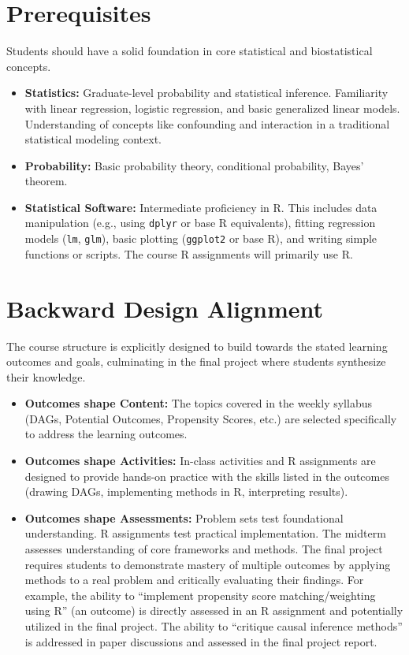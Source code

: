 \documentclass[10.5pt]{article}
\begin{document}
\section{Prerequisites}
Students should have a solid foundation in core statistical and biostatistical concepts.
\begin{itemize}
    \item \textbf{Statistics:} Graduate-level probability and statistical inference. Familiarity with linear regression, logistic regression, and basic generalized linear models. Understanding of concepts like confounding and interaction in a traditional statistical modeling context.
    \item \textbf{Probability:} Basic probability theory, conditional probability, Bayes' theorem.
    \item \textbf{Statistical Software:} Intermediate proficiency in R. This includes data manipulation (e.g., using \texttt{dplyr} or base R equivalents), fitting regression models (\texttt{lm}, \texttt{glm}), basic plotting (\texttt{ggplot2} or base R), and writing simple functions or scripts. The course R assignments will primarily use R.
\end{itemize}

\section{Backward Design Alignment}
The course structure is explicitly designed to build towards the stated learning outcomes and goals, culminating in the final project where students synthesize their knowledge.
\begin{itemize}
    \item \textbf{Outcomes shape Content:} The topics covered in the weekly syllabus (DAGs, Potential Outcomes, Propensity Scores, etc.) are selected specifically to address the learning outcomes.
    \item \textbf{Outcomes shape Activities:} In-class activities and R assignments are designed to provide hands-on practice with the skills listed in the outcomes (drawing DAGs, implementing methods in R, interpreting results).
    \item \textbf{Outcomes shape Assessments:} Problem sets test foundational understanding. R assignments test practical implementation. The midterm assesses understanding of core frameworks and methods. The final project requires students to demonstrate mastery of multiple outcomes by applying methods to a real problem and critically evaluating their findings. For example, the ability to ``implement propensity score matching/weighting using R'' (an outcome) is directly assessed in an R assignment and potentially utilized in the final project. The ability to ``critique causal inference methods'' is addressed in paper discussions and assessed in the final project report.
\end{itemize}
\end{document}
